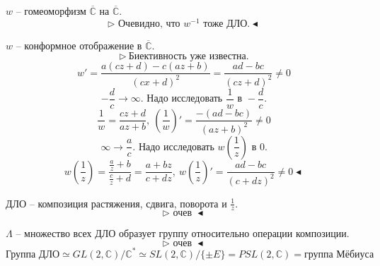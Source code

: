 $w$ -- гомеоморфизм $\overline{\mathbb{C}}$ на $\overline{\mathbb{C}}$.
\[\triangleright \text{ Очевидно, что $w^{-1}$ тоже ДЛО.} \blacktriangleleft\]

 $w$ -- конформное отображение в $\overline{\mathbb{C}}$.
\[\triangleright \ \text{Биективность уже известна.}\]
\[w' = \frac{a(cz+d) - c(az+b)}{(cx+d)^2} = \frac{ad-bc}{(cz+d)^2} \neq 0\]
\[-\frac{d}{c} \to \infty. \text{ Надо исследовать } \frac{1}{w} \text{ в } - \frac{d}{c}.\]
\[\frac{1}{w} = \frac{cz+d}{az+b}, \ \left(\frac{1}{w}\right)' = \frac{-(ad-bc)}{(az+b)^2} \neq 0\]
\[\infty \to \frac{a}{c}. \text{ Надо исследовать } w\left(\frac{1}{z}\right) \text{ в } 0.\]
\[w\left(\frac{1}{z}\right) = \frac{\frac{a}{z}+b}{\frac{c}{z}+d} = \frac{a+bz}{c+dz}, \ w\left(\frac{1}{z}\right)' = \frac{ad-bc}{(c+dz)^2} \neq 0 \blacktriangleleft\]

 ДЛО -- композиция растяжения, сдвига, поворота и $\frac{1}{z}$.
\[\triangleright \text{ очев } \blacktriangleleft\]

 $\Lambda$ -- множество всех ДЛО образует группу относительно операции композиции.
\[\triangleright \text{ очев } \blacktriangleleft\]
\[\text{Группа ДЛО} \simeq GL(2, \mathbb{C}) / \mathbb{C}^* \simeq SL(2, \mathbb{C}) / \{\pm E\} = PSL(2, \mathbb{C}) = \text{группа Мёбиуса}\]

